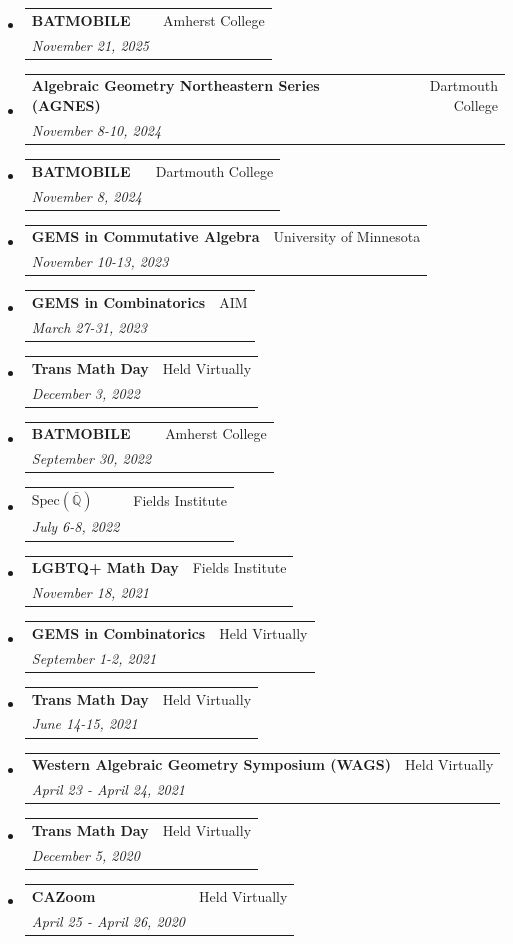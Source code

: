 \documentclass[letterpaper,11pt]{article}
\makeatletter
\newcommand{\ressubheading}[4]{
\begin{tabular*}{6.5in}[t]{l@{\cftdotfill{\cftsecdotsep}\extracolsep{\fill}}r}
		\textbf{#1} & #2 \\
		\textit{#3} & \textit{#4} \\
\end{tabular*}\vspace{-6pt}}
\makeatother
\begin{document}
\begin{itemize}
\item
\ressubheading{BATMOBILE}{Amherst College}{November 21, 2025}{} 


\item 
\ressubheading{Algebraic Geometry Northeastern Series (AGNES)}{Dartmouth College}{November 8-10, 2024}{}
 
\item
\ressubheading{BATMOBILE}{Dartmouth College}{November 8, 2024}{} 

\item 
\ressubheading{GEMS in Commutative Algebra}{University of Minnesota}{November 10-13, 2023}{} 

\item 
\ressubheading{GEMS in Combinatorics}{AIM}{March 27-31, 2023}{} 

\item 
\ressubheading{Trans Math Day }{Held Virtually}{December 3, 2022}{} 


\item
\ressubheading{BATMOBILE}{Amherst College}{September 30, 2022}{} 

\item 
\ressubheading{$\text{Spec}(\overline{\mathbb{Q}})$}{Fields Institute}{July 6-8, 2022}{} 

\item 
\ressubheading{LGBTQ+ Math Day}{Fields Institute}{November 18, 2021}{} 

\item 
\ressubheading{GEMS in Combinatorics}{Held Virtually}{September 1-2, 2021}{} 

\item 
\ressubheading{Trans Math Day }{Held Virtually}{June 14-15, 2021}{} 


\item
\ressubheading{Western Algebraic Geometry Symposium (WAGS)}{Held Virtually}{April 23 - April 24, 2021}{} 

\item 
\ressubheading{Trans Math Day }{Held Virtually}{December 5, 2020}{} 


\item 
\ressubheading{CAZoom}{Held Virtually}{April 25 - April 26, 2020}{} 


\end{itemize}
\end{document}
